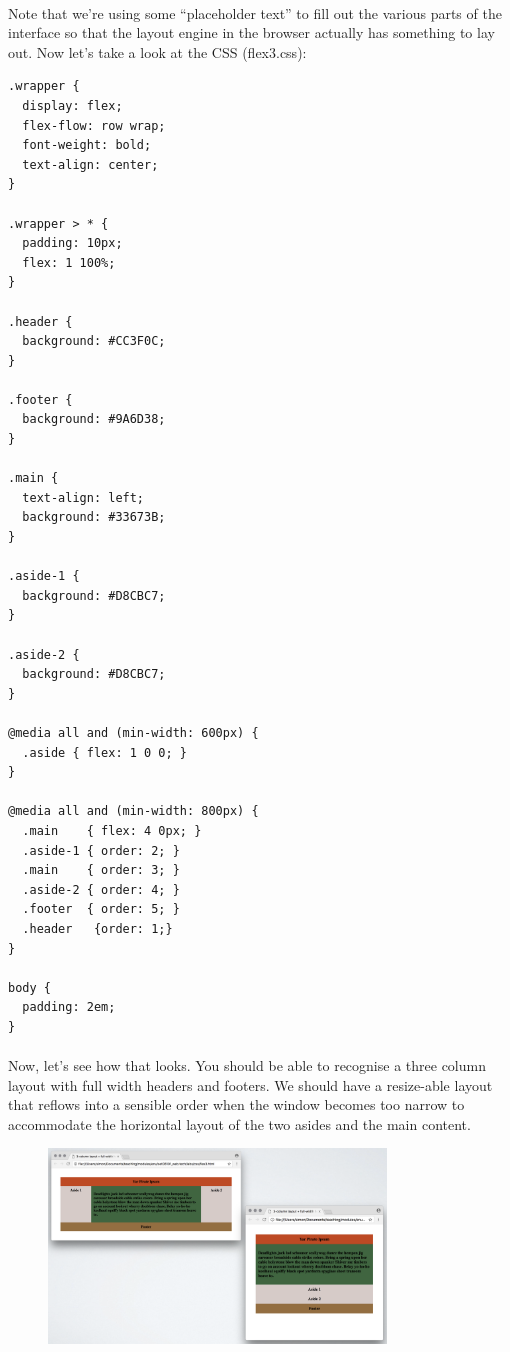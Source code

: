 \paragraph{} Note that we're using some ``placeholder text'' to fill out the various parts of the interface so that the layout engine in the browser actually has something to lay out. Now let's take a look at the CSS (flex3.css):

\begin{lstlisting}
.wrapper {
  display: flex;  
  flex-flow: row wrap;
  font-weight: bold;
  text-align: center;
}

.wrapper > * {
  padding: 10px;
  flex: 1 100%;
}

.header {
  background: #CC3F0C;
}

.footer {
  background: #9A6D38;
}

.main {
  text-align: left;
  background: #33673B;
}

.aside-1 {
  background: #D8CBC7;
}

.aside-2 {
  background: #D8CBC7;
}

@media all and (min-width: 600px) {
  .aside { flex: 1 0 0; }
}

@media all and (min-width: 800px) {
  .main    { flex: 4 0px; }
  .aside-1 { order: 2; } 
  .main    { order: 3; }
  .aside-2 { order: 4; }
  .footer  { order: 5; }
  .header   {order: 1;}
}

body {
  padding: 2em; 
}
\end{lstlisting}

\paragraph{} Now, let's see how that looks. You should be able to recognise a three column layout with full width headers and footers. We should have a resize-able layout that reflows into a sensible order when the window becomes too narrow to accommodate the horizontal layout of the two asides and the main content.

\begin{figure}[H]
\centering
\includegraphics[width=0.8\textwidth]{figures/flexbox-page-layout-example}
\label{fig:flexbox-page-layout-example}
\caption{}
\end{figure}



